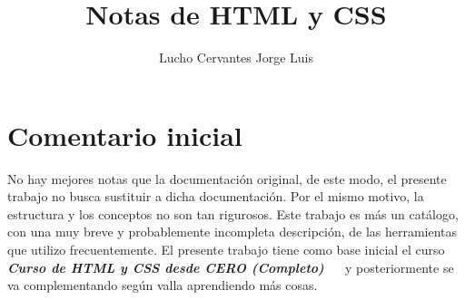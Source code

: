 \documentclass[10pt,oneside]{article}
\title{\textbf{Notas de HTML y CSS}}
\author{Lucho Cervantes Jorge Luis}
\begin{document}
 \maketitle 

\section{Comentario inicial}

    No hay mejores notas que la documentación original, de este modo, el presente trabajo no busca sustituir a dicha documentación. Por el mismo motivo, la estructura y los conceptos no son tan rigurosos. Este trabajo es más un catálogo, con una muy breve y probablemente incompleta descripción, de las herramientas que utilizo frecuentemente. El presente trabajo tiene como base inicial el curso \textit{\textbf{Curso de HTML y CSS desde CERO (Completo)}}  ~\cite{HTMLyCSSDalto} y posteriormente se va complementando según valla aprendiendo más cosas. 
    
\end{document}
